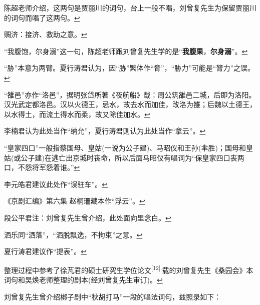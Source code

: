   陈超老师介绍，这两句是贾丽川的词句，台上一般不唱，刘曾复先生为保留贾丽川的词句而唱了这两句。\protect\hyperlink{fnref72}{↩}
\item
  \leavevmode\hypertarget{fn73}{}%
  赒济：接济、救助之意。\protect\hyperlink{fnref73}{↩}
\item
  \leavevmode\hypertarget{fn74}{}%
  ``我腹饱，尔身溺''这一句，陈超老师跟刘曾复先生学的是``\textbf{我腹果}，\textbf{尔身溺}''。\protect\hyperlink{fnref74}{↩}
\item
  \leavevmode\hypertarget{fn75}{}%
  ``胁''本意为两臂。夏行涛君认为，因``胁''繁体作``脅''，``胁力''可能是``膂力''之误。\protect\hyperlink{fnref75}{↩}
\item
  \leavevmode\hypertarget{fn76}{}%
  ``雒邑''亦作``洛邑''，据明张岱所著《夜航船》载：周公筑雒邑二城，后即为洛阳。汉光武定都洛邑。汉以火德王，忌水，故去水而加佳，改洛为雒；后魏以土德王，以水得土，而流土得水而柔，故又除佳加水。\protect\hyperlink{fnref76}{↩}
\item
  \leavevmode\hypertarget{fn77}{}%
  李楠君认为此处当作``纳允''，夏行涛君则认为此处当作``拿云''。\protect\hyperlink{fnref77}{↩}
\item
  \leavevmode\hypertarget{fn78}{}%
  ``皇家四口''一般指蔡国母、皇姑(一说为公子建)、马昭仪和王孙(芈胜)；国母和皇姑(或公子建)在逃亡出京城时丧命，所以后面马昭仪有唱词为``保皇家四口丧两口，不怨将军怨着谁。''\protect\hyperlink{fnref78}{↩}
\item
  \leavevmode\hypertarget{fn79}{}%
  李元皓君建议此处作``误驻车''。\protect\hyperlink{fnref79}{↩}
\item
  \leavevmode\hypertarget{fn80}{}%
  《京剧汇编》第六集
  赵桐珊藏本作``浮云''。\protect\hyperlink{fnref80}{↩}
\item
  \leavevmode\hypertarget{fn81}{}%
  段公平君注：刘曾复先生曾介绍，此处面向里念白。\protect\hyperlink{fnref81}{↩}
\item
  \leavevmode\hypertarget{fn82}{}%
  洒乐同``洒落''，``洒脱飘逸，不拘束''之意。\protect\hyperlink{fnref82}{↩}
\item
  \leavevmode\hypertarget{fn83}{}%
  夏行涛君建议作``提表''。\protect\hyperlink{fnref83}{↩}
\item
  \leavevmode\hypertarget{fn84}{}%
  整理过程中参考了徐芃君的硕士研究生学位论文\textsuperscript{{[}12{]}.}载的刘曾复先生《桑园会》本词句和吴焕老师整理的剧本(经刘曾复先生审订)。\protect\hyperlink{fnref84}{↩}
\item
  \leavevmode\hypertarget{fn85}{}%
  刘曾复先生曾介绍梆子剧中``秋胡打马''一段的唱法词句，兹照录如下：

